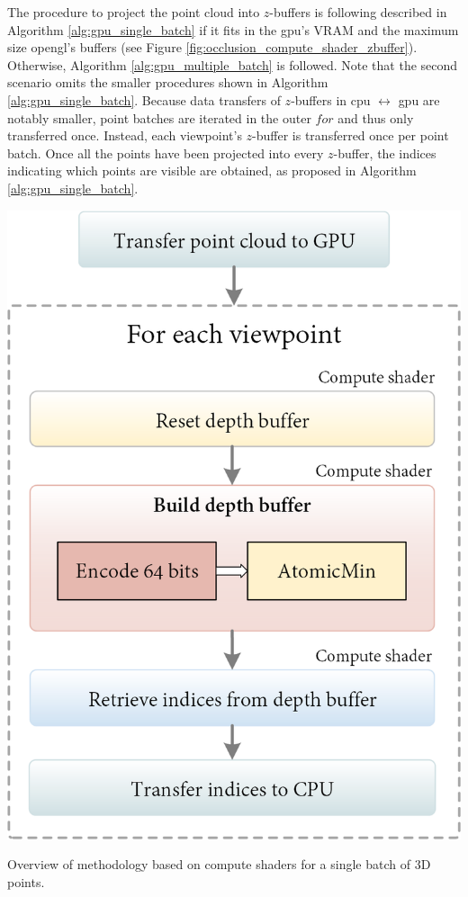 The procedure to project the point cloud into $z$-buffers is following described in Algorithm \ref{alg:gpu_single_batch} if it fits in the \acrshort{gpu}'s VRAM and the maximum size \acrshort{opengl}'s buffers (see Figure \ref{fig:occlusion_compute_shader_zbuffer}). Otherwise, Algorithm \ref{alg:gpu_multiple_batch} is followed. Note that the second scenario omits the smaller procedures shown in Algorithm \ref{alg:gpu_single_batch}. Because data transfers of $z$-buffers in \acrshort{cpu} $\leftrightarrow$ \acrshort{gpu} are notably smaller, point batches are iterated in the outer $\textit{for}$ and thus only transferred once. Instead, each viewpoint's $z$-buffer is transferred once per point batch. Once all the points have been projected into every $z$-buffer, the indices indicating which points are visible are obtained, as proposed in Algorithm \ref{alg:gpu_single_batch}.
\begin{marginfigure}[.3cm]
    \includegraphics[width=\linewidth]{figs/multi_thermal_projection/occlusion_compute_shader.png}
    \caption{Overview of methodology based on compute shaders for a single batch of 3D points.}
    \label{fig:occlusion_compute_shader_zbuffer}
\end{marginfigure}

